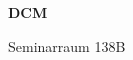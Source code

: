 \documentclass[a4paper]{article}
\begin{document}
\printGenericVSLHeader
\begin{center}
\begin{vsltext}{3cm}{4cm}

   \vspace{0.5cm} 

    \textbf{DCM} 

    \vspace{1.5cm}

    Seminarraum 138B

\end{vsltext}

\end{center}
\end{document}
